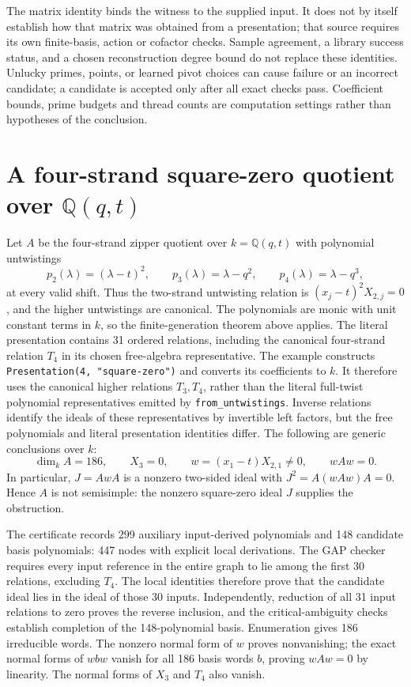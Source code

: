 \documentclass[11pt]{article}
\newcommand{\Q}{\mathbb Q}
\begin{document}
The matrix identity binds the witness to the supplied input. It does not by
itself establish how that matrix was obtained from a presentation; that source
requires its own finite-basis, action or cofactor checks. Sample agreement,
a library success status, and a chosen reconstruction degree bound do not
replace these identities. Unlucky primes, points, or learned pivot choices can
cause failure or an incorrect candidate; a candidate is accepted only after
all exact checks pass. Coefficient bounds, prime budgets and thread counts are
computation settings rather than hypotheses of the conclusion.

\section{A four-strand square-zero quotient over \texorpdfstring{$\Q(q,t)$}{Q(q,t)}}
Let $A$ be the four-strand zipper quotient over $k=\Q(q,t)$ with polynomial
untwistings
\[
 p_2(\lambda)=(\lambda-t)^2,\qquad
 p_3(\lambda)=\lambda-q^2,\qquad
 p_4(\lambda)=\lambda-q^3,
\]
at every valid shift. Thus the two-strand untwisting relation is
$(x_j-t)^2X_{2,j}=0$, and the higher untwistings are canonical. The polynomials are monic with unit constant terms in $k$, so the
finite-generation theorem above applies. The literal presentation contains
31 ordered relations, including the canonical
four-strand relation $T_4$ in its chosen free-algebra representative.
The example constructs \texttt{Presentation(4, "square-zero")} and converts
its coefficients to $k$. It therefore uses the canonical higher relations
$T_3,T_4$, rather than the literal full-twist polynomial representatives
emitted by \texttt{from\_untwistings}. Inverse relations identify the ideals
of these representatives by invertible left factors, but the free polynomials
and literal presentation identities differ.
The following are generic conclusions over $k$:
\[
 \dim_k A=186,\qquad X_3=0,\qquad
 w=(x_1-t)X_{2,1}\ne0,\qquad wAw=0.
\]
In particular, $J=AwA$ is a nonzero two-sided ideal with
$J^2=A(wAw)A=0$. Hence $A$ is not semisimple: the nonzero square-zero ideal $J$ supplies
the obstruction.

The certificate records 299 auxiliary input-derived polynomials and
148 candidate basis polynomials: 447 nodes with explicit local derivations.
The GAP checker requires every input reference in the entire graph to lie
among the first 30 relations, excluding $T_4$. The local identities therefore
prove that the candidate ideal lies in the ideal of those 30 inputs.
Independently, reduction of all 31 input relations to zero proves the
reverse inclusion, and the critical-ambiguity checks establish completion of
the 148-polynomial basis. Enumeration gives 186 irreducible words. The
nonzero normal form of $w$ proves nonvanishing; the exact normal forms of
$wbw$ vanish for all 186 basis words $b$, proving $wAw=0$ by linearity.
The normal forms of $X_3$ and $T_4$ also vanish.
\end{document}
